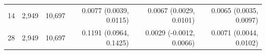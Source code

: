 \begin{tabular}{lrrrrr}
14 & 2,949 & 10,697 & 0.0077 (0.0039, 0.0115) & 0.0067 (0.0029, 0.0101) & 0.0065 (0.0035, 0.0097) \\
28 & 2,949 & 10,697 & 0.1191 (0.0964, 0.1425) & 0.0029 (-0.0012, 0.0066) & 0.0071 (0.0044, 0.0102) \\
\bottomrule
\end{tabular}
